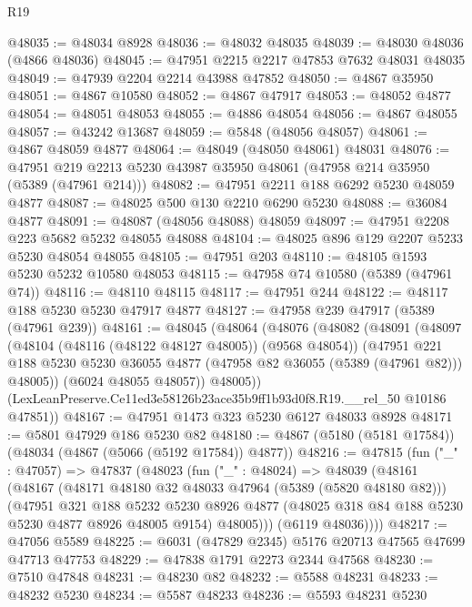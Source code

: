 \begin{lexlean}{R19}
\begin{coremodule}
@48035 := @48034 @8928
@48036 := @48032 @48035
@48039 := @48030 @48036 (@4866 @48036)
@48045 := @47951 @2215 @2217 @47853 @7632 @48031 @48035
@48049 := @47939 @2204 @2214 @43988 @47852
@48050 := @4867 @35950
@48051 := @4867 @10580
@48052 := @4867 @47917
@48053 := @48052 @4877
@48054 := @48051 @48053
@48055 := @4886 @48054
@48056 := @4867 @48055
@48057 := @43242 @13687
@48059 := @5848 (@48056 @48057)
@48061 := @4867 @48059 @4877
@48064 := @48049 (@48050 @48061) @48031
@48076 := @47951 @219 @2213 @5230 @43987 @35950 @48061 (@47958 @214 @35950 (@5389 (@47961 @214)))
@48082 := @47951 @2211 @188 @6292 @5230 @48059 @4877
@48087 := @48025 @500 @130 @2210 @6290 @5230
@48088 := @36084 @4877
@48091 := @48087 (@48056 @48088) @48059
@48097 := @47951 @2208 @223 @5682 @5232 @48055 @48088
@48104 := @48025 @896 @129 @2207 @5233 @5230 @48054 @48055
@48105 := @47951 @203
@48110 := @48105 @1593 @5230 @5232 @10580 @48053
@48115 := @47958 @74 @10580 (@5389 (@47961 @74))
@48116 := @48110 @48115
@48117 := @47951 @244
@48122 := @48117 @188 @5230 @5230 @47917 @4877
@48127 := @47958 @239 @47917 (@5389 (@47961 @239))
@48161 := @48045
    (@48064
      (@48076
        (@48082
          (@48091
            (@48097
              (@48104 (@48116 (@48122 @48127 @48005)) (@9568 @48054))
              (@47951
                @221
                @188
                @5230
                @5230
                @36055
                @4877
                (@47958 @82 @36055 (@5389 (@47961 @82)))
                @48005))
            (@6024 @48055 @48057))
          @48005))
      (LexLeanPreserve.Ce11ed3e58126b23ace35b9ff1b93d0f8.R19.__rel_50 @10186 @47851))
@48167 := @47951 @1473 @323 @5230 @6127 @48033 @8928
@48171 := @5801 @47929 @186 @5230 @82
@48180 := @4867 (@5180 (@5181 @17584)) (@48034 (@4867 (@5066 (@5192 @17584)) @4877))
@48216 := @47815
    (fun ("_" : @47057) =>
    @47837
      (@48023
        (fun ("_" : @48024) =>
        @48039
          (@48161
            (@48167
              (@48171 @48180 @32 @48033 @47964 (@5389 (@5820 @48180 @82)))
              (@47951
                @321
                @188
                @5232
                @5230
                @8926
                @4877
                (@48025 @318 @84 @188 @5230 @5230 @4877 @8926 @48005 @9154)
                @48005)))
          (@6119 @48036))))
@48217 := @47056 @5589
@48225 := @6031 (@47829 @2345) @5176 @20713 @47565 @47699 @47713 @47753
@48229 := @47838 @1791 @2273 @2344 @47568
@48230 := @7510 @47848
@48231 := @48230 @82
@48232 := @5588 @48231
@48233 := @48232 @5230
@48234 := @5587 @48233
@48236 := @5593 @48231 @5230

\end{coremodule}
\end{lexlean}
